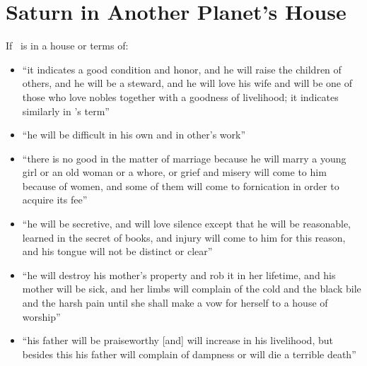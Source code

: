 \section{Saturn in Another Planet's House}
If \Saturn\, is in a house or terms of:
\begin{itemize}[topsep=0em,itemsep=0em]
\item[\Jupiter] ``it indicates a good condition and honor, and he will raise the children of others, and he will be a steward, and he will love his wife and will be one of those who love nobles together with a goodness of livelihood; it indicates similarly in \Jupiter's term''

\item[\Mars] ``he will be difficult in his own and in other's work''

\item[\Venus] ``there is no good in the matter of marriage because he will marry a young girl or an old woman or a whore, or grief and misery will come to him because of women, and some of them will come to fornication in order to acquire its fee''

\item[\Mercury] ``he will be secretive, and will love silence except that he will be reasonable, learned in the secret of books, and injury will come to him for this reason, and his tongue will not be distinct or clear''

\item[\Moon] ``he will destroy his mother's property and rob it in her lifetime, and his mother will be sick, and her limbs will complain of the cold and the black bile and the harsh pain until she shall make a vow for herself to a house of worship''

\item[\Sun] ``his father will be praiseworthy [and] will increase in his livelihood, but besides this his father will complain of dampness or will die a terrible death''


\end{itemize}